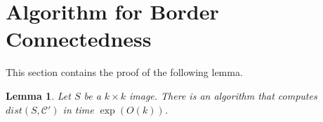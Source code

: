 \documentclass[11pt,english]{article}
\newtheorem{lemma}[theorem]{Lemma}
\numberwithin{figure}{section}
\newcommand{\C}{{\mathcal C}}
\newcommand{\eps}{{\epsilon}}
\newcommand{\dis}{dist}
\newcommand{\integerset}[1]{[0..{#1})}
\newcommand{\lind}{t}
\begin{document}
\begin{comment}
Assume that the algorithm detects a witness $S$. There are at most $\frac{16}{\eps^2}<\frac{\eps n^2}{2}$ pixels  in $S$. Since $\dis(M,\C)\geq \eps$, there are at least $\eps n^2$ black pixels in $M$, and at least $\frac{\eps n^2}{2}$  of them are outside $S$.  The probability that Algorithm~\ref{alg:connectedness_tester-na} fails to detect at least one of these black pixels in Step~\ref{step:conn-tester-pixel-sampling} is at most $(1-\frac{\eps}{2})^{\frac{4}{\eps}}<e^{-2}<1/6$. Thus, the algorithm detects a witness and a black pixel outside it with probability at least $1-(1/6+1/6)=2/3,$ as required.




\paragraph{Query and time complexity.}
The algorithm samples $2^{\lind+1}$ squares of $S_{r_\lind}$, for
$\lind\in\integerset{\log\frac{1}{\eps}}$, and inside each square queries
$(\frac{4}{\eps}\cdot2^{-\lind}-1)(\frac{4}{\eps}\cdot2^{-\lind}-1)<\frac{16}{\eps^{2}2^{2\lind}}$ pixels.
Thus, the query complexity of the algorithm is
$$\sum\nolimits_{\lind=0}^{\log\frac{1}{\eps}} 2^{\lind+1}\cdot \frac{16}{\eps^{2}2^{2\lind}}<\sum\nolimits_{\lind=0}^{\log\frac{1}{\eps}}\frac{32}{\eps^{2}2^{\lind}}=O\Big(\frac{1}{\eps^{2}}\Big).$$
The time complexity is linear in the number of samples, since BFS takes time linear in the number of vertices on bounded-degree graphs, and the remaining steps can be easily implemented to run in the time proportional to the number of sampled pixels.
\end{proof}
\end{comment}

\iffalse
\appendix

\section{Algorithm for Border Connectedness}
\label{sec:border-con}
\newcommand{\Out}{\mbox{\it Out}}
\newcommand{\cMb}{\overline{{\mathcal M}}}
\newcommand{\Be}{{\bf B}}

This section contains the proof of the following lemma.

\begin{lemma}
\label{thm:border-con}
Let $S$ be a $k\times k$ image. There is an algorithm that computes $\dis(S,\C')$ in time $\exp \left (O(k)\right)$.
\end{lemma}
\end{document}
